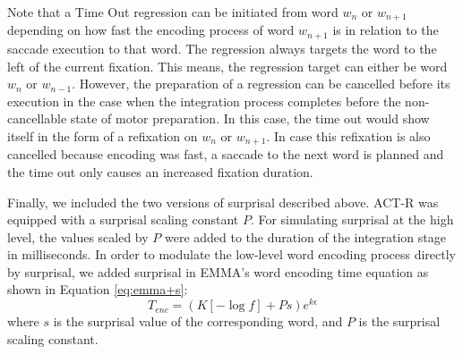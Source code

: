 \documentclass{cambridge7A}\usepackage[]{graphicx}\usepackage[]{color}
\begin{document}
Note that a Time Out regression can be initiated from word $w_{n}$ or $w_{n+1}$ depending on how fast the encoding process of word $w_{n+1}$ is in relation to the saccade execution to that word.  The regression always targets the word to the left of the current fixation.  This means, the regression target can either be word $w_{n}$ or  $w_{n-1}$.  However, the preparation of a regression can be cancelled before its execution in the case when the integration process completes before the non-cancellable state of motor preparation.  In this case, the time out would show itself in the form of a refixation on $w_{n}$ or $w_{n+1}$.  In case this refixation is also cancelled because encoding was fast, a saccade to the next word is planned and the time out only causes an increased fixation duration.

Finally, we included the two versions of surprisal described above.  ACT-R was equipped with a surprisal scaling constant $P$. 
For simulating surprisal at the high level, the values scaled by $P$ were added to the duration of the integration stage in milliseconds.  In order to modulate the low-level word encoding process directly by surprisal, we added surprisal in EMMA's word encoding time equation as shown in Equation \ref{eq:emma+s}:
\begin{equation}
T_{enc} = (K [-\log{f}] + Ps)e^{k\epsilon}
\label{eq:emma+s}
\end{equation}
where $s$ is the surprisal value of the corresponding word, and $P$ is the surprisal scaling constant.
\end{document}
